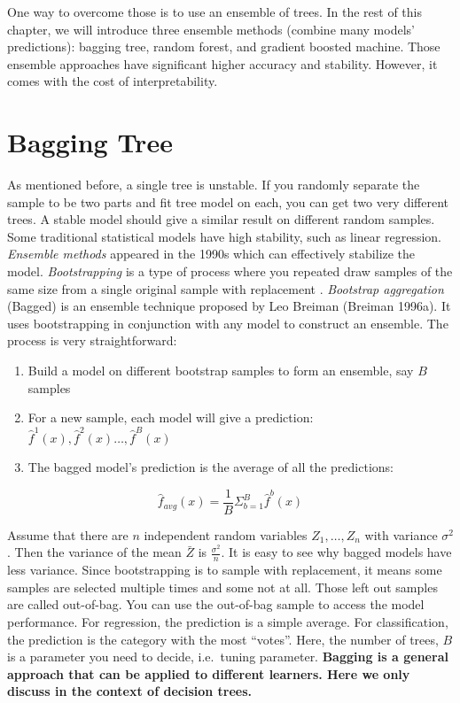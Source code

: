 \documentclass[12pt,]{krantz}
\providecommand{\tightlist}{%
  \setlength{\itemsep}{0pt}\setlength{\parskip}{0pt}}
\begin{document}
One way to overcome those is to use an ensemble of trees. In the rest of this chapter, we will introduce three ensemble methods (combine many models' predictions): bagging tree, random forest, and gradient boosted machine. Those ensemble approaches have significant higher accuracy and stability. However, it comes with the cost of interpretability.

\hypertarget{bagging-tree-1}{%
\section{Bagging Tree}\label{bagging-tree-1}}

As mentioned before, a single tree is unstable. If you randomly separate the sample to be two parts and fit tree model on each, you can get two very different trees. A stable model should give a similar result on different random samples. Some traditional statistical models have high stability, such as linear regression. \emph{Ensemble methods} appeared in the 1990s which can effectively stabilize the model. \emph{Bootstrapping} is a type of process where you repeated draw samples of the same size from a single original sample with replacement \citep{Efron1986}. \emph{Bootstrap aggregation} (Bagged) is an ensemble technique proposed by Leo Breiman (Breiman 1996a). It uses bootstrapping in conjunction with any model to construct an ensemble. The process is very straightforward:

\begin{enumerate}
\def\labelenumi{\arabic{enumi}.}
\tightlist
\item
  Build a model on different bootstrap samples to form an ensemble, say \(B\) samples
\item
  For a new sample, each model will give a prediction: \(\hat{f}^1(x),\hat{f}^2(x)\dots,\hat{f}^B(x)\)
\item
  The bagged model's prediction is the average of all the predictions:
\end{enumerate}

\[\hat{f}_{avg}(x)=\frac{1}{B}\Sigma^B_{b=1}\hat{f}^b(x)\]

Assume that there are \(n\) independent random variables \(Z_1,\dots,Z_n\) with variance \(\sigma^2\). Then the variance of the mean \(\bar{Z}\) is \(\frac{\sigma^2}{n}\). It is easy to see why bagged models have less variance. Since bootstrapping is to sample with replacement, it means some samples are selected multiple times and some not at all. Those left out samples are called out-of-bag. You can use the out-of-bag sample to access the model performance. For regression, the prediction is a simple average. For classification, the prediction is the category with the most ``votes''. Here, the number of trees, \(B\) is a parameter you need to decide, i.e.~tuning parameter. \textbf{Bagging is a general approach that can be applied to different learners. Here we only discuss in the context of decision trees.}
\end{document}
